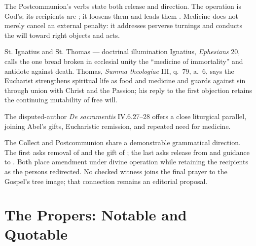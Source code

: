 The Postcommunion's verbs state both release and direction. The operation is God's; its recipients are ; it loosens them  and leads them . Medicine does not merely cancel an external penalty: it addresses perverse turnings and conducts the will toward right objects and acts.

\begin{sourcecard}{St. Ignatius and St. Thomas --- doctrinal illumination}
Ignatius, \emph{Ephesians} 20, calls the one bread broken in ecclesial unity the ``medicine of immortality'' and antidote against death. Thomas, \emph{Summa theologiae} III, q.~79, a.~6, says the Eucharist strengthens spiritual life as food and medicine and guards against sin through union with Christ and the Passion; his reply to the first objection retains the continuing mutability of free will.
\end{sourcecard}

The disputed-author \emph{De sacramentis} IV.6.27--28 offers a close liturgical parallel, joining Abel's gifts, Eucharistic remission, and repeated need for medicine.

The Collect and Postcommunion share a demonstrable grammatical direction. The first asks removal of  and the gift of ; the last asks release from  and guidance to . Both place amendment under divine operation while retaining the recipients as the persons redirected. No checked witness joins the final prayer to the Gospel's tree image; that connection remains an editorial proposal.

\sectionguard
\section*{The Propers: Notable and Quotable}

